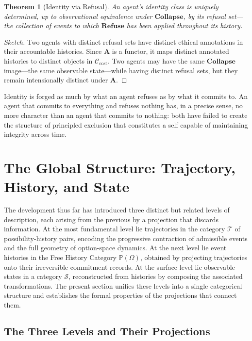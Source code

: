 \documentclass[12pt]{article}
\theoremstyle{plain}
\newtheorem{theorem}{Theorem}[section]
\theoremstyle{definition}
\theoremstyle{remark}
\newcommand{\Refuse}{\mathbf{Refuse}}
\newcommand{\Collapse}{\mathbf{Collapse}}
\newcommand{\PathCat}{\mathbb{P}(\Omega)}
\newcommand{\Acct}{\mathbf{A}}
\begin{document}
\begin{theorem}[Identity via Refusal]
\label{thm:refusal-identity}
An agent's identity class is uniquely determined, up to observational
equivalence under $\Collapse$, by its refusal set---the collection of events
to which $\Refuse$ has been applied throughout its history.
\end{theorem}

\begin{proof}[Sketch]
Two agents with distinct refusal sets have distinct ethical annotations in their
accountable histories.  Since $\Acct$ is a functor, it maps distinct annotated
histories to distinct objects in $\mathcal{C}_{\mathrm{cost}}$.  Two agents
may have the same $\Collapse$ image---the same observable state---while having
distinct refusal sets, but they remain intensionally distinct under $\Acct$.
\end{proof}

Identity is forged as much by what an agent refuses as by what it commits to.
An agent that commits to everything and refuses nothing has, in a precise sense,
no more character than an agent that commits to nothing: both have failed to
create the structure of principled exclusion that constitutes a self capable of
maintaining integrity across time.


\section{The Global Structure: Trajectory, History, and State}
\label{sec:global-structure}

The development thus far has introduced three distinct but related levels of
description, each arising from the previous by a projection that discards
information.  At the most fundamental level lie trajectories in the category
$\mathcal{T}$ of possibility-history pairs, encoding the progressive contraction
of admissible events and the full geometry of option-space dynamics.  At the
next level lie event histories in the Free History Category $\PathCat$, obtained
by projecting trajectories onto their irreversible commitment records.  At the
surface level lie observable states in a category $\mathcal{S}$, reconstructed
from histories by composing the associated transformations.  The present section
unifies these levels into a single categorical structure and establishes the
formal properties of the projections that connect them.

\subsection{The Three Levels and Their Projections}
\end{document}
